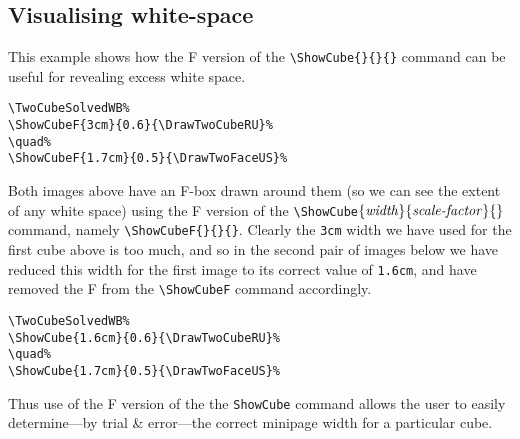 \documentclass[a4paper]{article}
\begin{document}

\bigskip

\subsection{Visualising white-space}

This example shows  how the  F version of the \verb!\ShowCube{}{}{}! command can be useful for revealing excess white space.


 
 \bigskip 
 
\TwoCubeSolvedWB%
%
\quad{}%
\hspace{1cm}
\begin{minipage}{0.3\textwidth}
\begin{verbatim}
\TwoCubeSolvedWB% 
\ShowCubeF{3cm}{0.6}{\DrawTwoCubeRU}%
\quad%
\ShowCubeF{1.7cm}{0.5}{\DrawTwoFaceUS}%
\end{verbatim}
\end{minipage}
 
 
\bigskip 
 
 Both images above have  an F-box drawn around them (so we can see the
 extent of any white space) using the  F version of the  \verb!\ShowCube!$\{\mbox{\textit{width}}\}\{\mbox{\textit{scale-factor}}\}\{\}$ command, 
 namely \verb!\ShowCubeF{}{}{}!.  Clearly the \verb!3cm! width we have 
 used for the first cube above is too much, and so in the second pair 
 of images below  we have reduced this width for the first image  to 
 its correct value of \verb!1.6cm!, and have removed the F from the 
 \verb!\ShowCubeF! command accordingly.

\bigskip 
 
\quad%
\TwoCubeSolvedWB%
%
\quad%
%
\hspace{1cm}
\begin{minipage}{0.3\textwidth}
\begin{verbatim}
\TwoCubeSolvedWB% 
\ShowCube{1.6cm}{0.6}{\DrawTwoCubeRU}%
\quad%
\ShowCube{1.7cm}{0.5}{\DrawTwoFaceUS}%
\end{verbatim}
\end{minipage}

\bigskip

Thus use of the F version of the the \verb!ShowCube! command allows 
the user to easily determine---by trial \& error---the correct minipage 
width  for a particular cube. 
\end{document}
